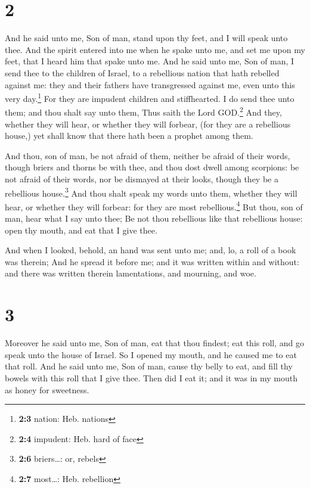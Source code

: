 \hypertarget{section-1}{%
\section{2}\label{section-1}}

 And he said unto me, Son of man, stand upon thy feet, and
I will speak unto thee.  And the spirit entered into me
when he spake unto me, and set me upon my feet, that I heard him that
spake unto me.  And he said unto me, Son of man, I send
thee to the children of Israel, to a rebellious nation that hath
rebelled against me: they and their fathers have transgressed against
me, even unto this very day.\footnote{\textbf{2:3} nation: Heb. nations}
 For they are impudent children and stiffhearted. I do
send thee unto them; and thou shalt say unto them, Thus saith the Lord
GOD.\footnote{\textbf{2:4} impudent: Heb. hard of face} 
And they, whether they will hear, or whether they will forbear, (for
they are a rebellious house,) yet shall know that there hath been a
prophet among them.

 And thou, son of man, be not afraid of them, neither be
afraid of their words, though briers and thorns be with thee, and thou
dost dwell among scorpions: be not afraid of their words, nor be
dismayed at their looks, though they be a rebellious house.\footnote{\textbf{2:6}
  briers\ldots: or, rebels}  And thou shalt speak my words
unto them, whether they will hear, or whether they will forbear: for
they are most rebellious.\footnote{\textbf{2:7} most\ldots: Heb.
  rebellion}  But thou, son of man, hear what I say unto
thee; Be not thou rebellious like that rebellious house: open thy mouth,
and eat that I give thee.

 And when I looked, behold, an hand was sent unto me; and,
lo, a roll of a book was therein;  And he spread it
before me; and it was written within and without: and there was written
therein lamentations, and mourning, and woe.

\hypertarget{section-2}{%
\section{3}\label{section-2}}

 Moreover he said unto me, Son of man, eat that thou
findest; eat this roll, and go speak unto the house of Israel.
 So I opened my mouth, and he caused me to eat that roll.
 And he said unto me, Son of man, cause thy belly to eat,
and fill thy bowels with this roll that I give thee. Then did I eat it;
and it was in my mouth as honey for sweetness.

